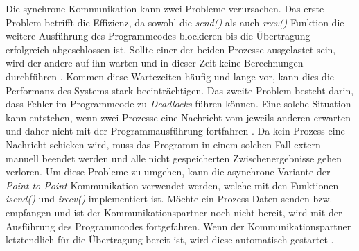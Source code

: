 Die synchrone Kommunikation kann zwei Probleme verursachen. Das erste Problem betrifft die Effizienz, da sowohl die \emph{send()} als auch \emph{recv()} Funktion die weitere Ausführung des Programmcodes blockieren bis die Übertragung erfolgreich abgeschlossen ist. Sollte einer der beiden Prozesse ausgelastet sein, wird der andere auf ihn warten und in dieser Zeit keine Berechnungen durchführen \cite{nielsen2016introduction}. Kommen diese Wartezeiten häufig und lange vor, kann dies die Performanz des Systems stark beeinträchtigen. Das zweite Problem besteht darin, dass Fehler im Programmcode zu \emph{Deadlocks} führen können. Eine solche Situation kann entstehen, wenn zwei Prozesse eine Nachricht vom jeweils anderen erwarten und daher nicht mit der Programmausführung fortfahren \cite{nielsen2016introduction}. Da kein Prozess eine Nachricht schicken wird, muss das Programm in einem solchen Fall extern manuell beendet werden und alle nicht gespeicherten Zwischenergebnisse gehen verloren. Um diese Probleme zu umgehen, kann die asynchrone Variante der \emph{Point-to-Point} Kommunikation verwendet werden, welche mit den Funktionen \emph{isend()} und \emph{irecv()} implementiert ist. Möchte ein Prozess Daten senden bzw. empfangen und ist der Kommunikationspartner noch nicht bereit, wird mit der Ausführung des Programmcodes fortgefahren. Wenn der Kommunikationspartner letztendlich für die Übertragung bereit ist, wird diese automatisch gestartet \cite{nielsen2016introduction}. 

